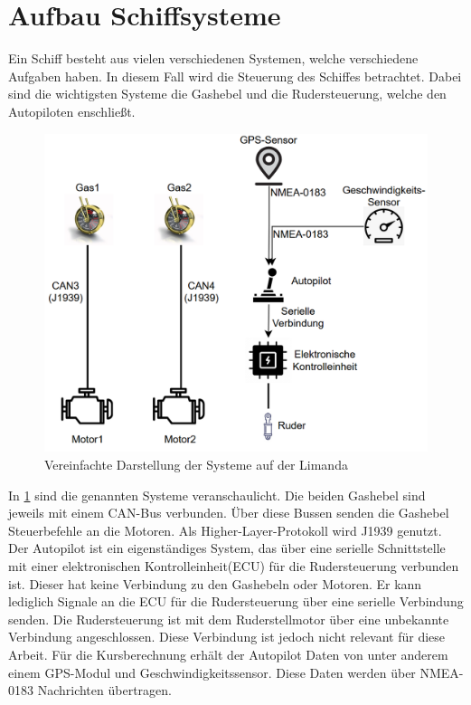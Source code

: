 \section{Aufbau Schiffsysteme}
Ein Schiff besteht aus vielen verschiedenen Systemen, welche verschiedene Aufgaben haben. In diesem Fall wird die
Steuerung des Schiffes betrachtet. Dabei sind die wichtigsten Systeme die Gashebel und die Rudersteuerung, welche den Autopiloten enschließt.
\begin{figure}[H]
    \centering
    \includegraphics[scale=0.5]{images/limandaSystem.png}
    \caption{Vereinfachte Darstellung der Systeme auf der Limanda}
    \label{fig:limandaSystem}
\end{figure}
In \ref{fig:limandaSystem} sind die genannten Systeme veranschaulicht. Die beiden Gashebel sind jeweils
mit einem CAN-Bus verbunden. Über diese Bussen senden die Gashebel Steuerbefehle an die Motoren. Als Higher-Layer-Protokoll wird J1939 genutzt. \\
Der Autopilot ist ein eigenständiges System, das über eine serielle Schnittstelle mit einer elektronischen Kontrolleinheit(ECU) 
für die Rudersteuerung verbunden ist.
Dieser hat keine Verbindung zu den Gashebeln oder Motoren. Er kann lediglich Signale an die ECU für die Rudersteuerung über
eine serielle Verbindung senden. Die Rudersteuerung ist mit dem Ruderstellmotor über eine unbekannte Verbindung angeschlossen. Diese Verbindung ist
jedoch nicht relevant für diese Arbeit. Für die Kursberechnung erhält der Autopilot Daten von unter anderem einem GPS-Modul und Geschwindigkeitssensor.
Diese Daten werden über NMEA-0183 Nachrichten übertragen. 

